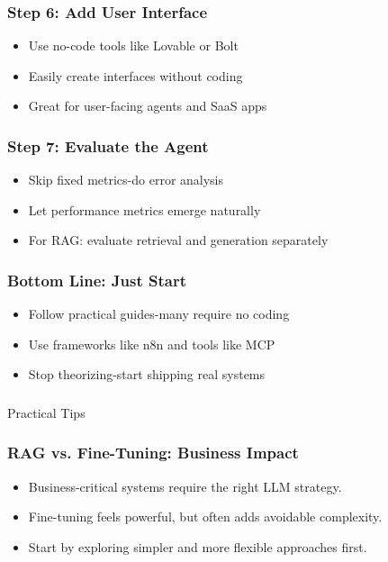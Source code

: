 \begin{frame}[fragile]\frametitle{Step 6: Add User Interface}
      \begin{itemize}
        \item Use no-code tools like Lovable or Bolt
        \item Easily create interfaces without coding
        \item Great for user-facing agents and SaaS apps
      \end{itemize}
\end{frame}

\begin{frame}[fragile]\frametitle{Step 7: Evaluate the Agent}
      \begin{itemize}
        \item Skip fixed metrics-do error analysis
        \item Let performance metrics emerge naturally
        \item For RAG: evaluate retrieval and generation separately
      \end{itemize}
\end{frame}

\begin{frame}[fragile]\frametitle{Bottom Line: Just Start}
      \begin{itemize}
        \item Follow practical guides-many require no coding
        \item Use frameworks like n8n and tools like MCP
        \item Stop theorizing-start shipping real systems
      \end{itemize}
\end{frame}


\begin{frame}[fragile]\frametitle{}
\begin{center}
{\Large Practical Tips}
\end{center}
\end{frame}

\begin{frame}[fragile]\frametitle{RAG vs. Fine-Tuning: Business Impact}
    \begin{itemize}
        \item Business-critical systems require the right LLM strategy.
        \item Fine-tuning feels powerful, but often adds avoidable complexity.
        \item Start by exploring simpler and more flexible approaches first.
    \end{itemize}
\end{frame}

